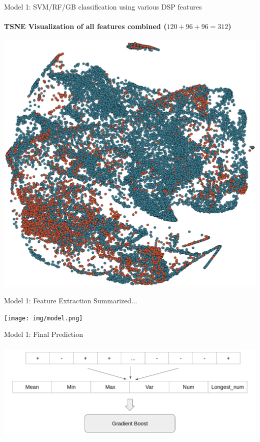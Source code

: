 \documentclass{beamer}
\begin{document}
\begin{frame}{Model 1: SVM/RF/GB classification using various DSP features}
  \framesubtitle{TSNE Visualization of all features combined ($120+96+96 = 312$)}

  \begin{center}
    \vspace*{-0.15cm}
  \includegraphics[scale=0.35]{img/trad_feat_viz.eps}
  \end{center}

\end{frame}

\begin{frame}{Model 1: Feature Extraction Summarized...}

  \begin{center}
  \texttt{[image: img/model.png]}
  \end{center}

\end{frame}

\begin{frame}{Model 1: Final Prediction}
  \framesubtitle{}
  \begin{center}
  \includegraphics[scale=0.2]{img/window.png}
  \end{center}
\end{frame}
\end{document}
